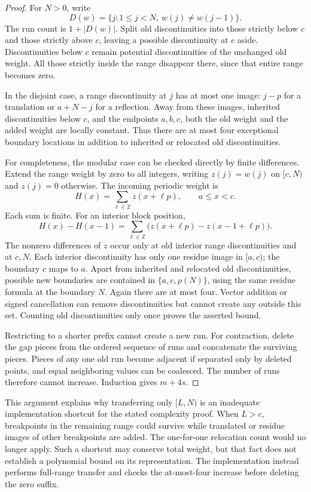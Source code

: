 \begin{proof}
For $N>0$, write
\[
 D(w)=\{j:1\leq j<N,\ w(j)\ne w(j-1)\}.
\]
The run count is $1+|D(w)|$.  Split old discontinuities into those strictly
below $c$ and those strictly above $c$, leaving a possible discontinuity at
$c$ aside.  Discontinuities below $c$ remain potential discontinuities of the
unchanged old weight.  All those strictly inside the range disappear there,
since that entire range becomes zero.

In the disjoint case, a range discontinuity at $j$ has at most one image:
$j-p$ for a translation or $a+N-j$ for a reflection.  Away from these images,
inherited discontinuities below $c$, and the endpoints $a,b,c$, both the old
weight and the added weight are locally constant.  Thus there are at most
four exceptional boundary locations in addition to inherited or relocated
old discontinuities.

For completeness, the modular case can be checked directly by finite
differences.  Extend the range weight by zero to all integers, writing
$z(j)=w(j)$ on $[c,N)$ and $z(j)=0$ otherwise.  The incoming periodic weight is
\[
 H(x)=\sum_{\ell\in\mathbb Z}z(x+\ell p),\qquad a\leq x<c.
\]
Each sum is finite.  For an interior block position,
\[
 H(x)-H(x-1)
 =\sum_{\ell\in\mathbb Z}
   \bigl(z(x+\ell p)-z(x-1+\ell p)\bigr).
\]
The nonzero differences of $z$ occur only at old interior range
discontinuities and at $c,N$.  Each interior discontinuity has only one
residue image in $[a,c)$; the boundary $c$ maps to $a$.  Apart from inherited
and relocated old discontinuities, possible new boundaries are contained in
$\{a,c,\rho(N)\}$, using the same residue formula at the boundary $N$.
Again there are at most four.  Vector addition or signed
cancellation can remove discontinuities but cannot create any outside this
set.  Counting old discontinuities only once proves the asserted bound.

Restricting to a shorter prefix cannot create a new run.  For contraction,
delete the gap pieces from the ordered sequence of runs and concatenate the
surviving pieces.  Pieces of any one old run become adjacent if separated only
by deleted points, and equal neighboring values can be coalesced.  The number
of runs therefore cannot increase.  Induction gives $m+4s$.
\end{proof}

This argument explains why transferring only $[L,N)$ is an inadequate
implementation shortcut for the stated complexity proof.  When $L>c$,
breakpoints in the remaining range could survive while translated or residue
images of other breakpoints are added.  The one-for-one relocation count
would no longer apply.  Such a shortcut may conserve total weight, but that
fact does not establish a polynomial bound on its representation.  The
implementation instead performs full-range transfer and checks the
at-most-four increase before deleting the zero suffix.

